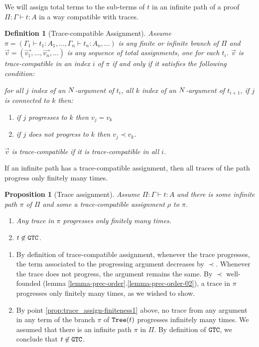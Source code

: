 \documentclass{article}
\newtheorem{proposition}[theorem]{Proposition}
\newtheorem{definition}[theorem]{Definition}
\newenvironment{proof}[1][Proof]{\begin{trivlist}
\item[\hskip \labelsep {\bfseries #1}]}{\end{trivlist}}
\begin{document}
We will assign total terms to  the sub-terms of $t$
in an infinite path of a proof $\Pi : \Gamma \vdash t: A$ in a way compatible with traces. 


\begin{definition}[Trace-compatible Assignment]
\label{definition-trace-compatible}
Assume $\pi  = (\Gamma_1 \vdash t_1:A_1, \ldots, \Gamma_n \vdash t_n:A_n, \ldots)$ 
is any finite or infinite branch of $\Pi$
and $\vec{v} = (\vec{v_1}, \ldots, \vec{v_n}, \ldots)$ 
is any sequence of total assignments, one for each $t_i$. 
$\vec{v}$ is \emph{trace-compatible} in an index $i$ of $\pi$  
if and only if it satisfies the following condition:

  for all $j$  index of an ${N}$-argument of $t_i$, 
  all $k$ index of an ${N}$-argument of $t_{i+1}$, 
  if $j$ is connected to $k$ then:
 \begin{enumerate}
 \item
 if $j$ progresses to $k$ then $v_j = v_k$
 \item
 if $j$ does not progress to $k$ then $v_j \prec v_k$.
 \end{enumerate}
$\vec{v}$ is \emph{trace-compatible} if it is trace-compatible in all $i$.
\end{definition}

If an infinite path has a trace-compatible assignment, 
then all traces of the path progress only finitely many times.



\begin{proposition}[Trace assignment]
\label{prop:trace_assign-finiteness}
Assume $\Pi:\Gamma \vdash t:A$ and there is some infinite path $\pi$ of $\Pi$ and
some a trace-compatible assignment  $\rho$ to $\pi$. 
\begin{enumerate}
\item
\label{prop:trace_assign-finiteness1}
Any trace in $\pi$ progresses only finitely many times.
\item
\label{prop:trace_assign-finiteness2}
$t \not \in {\tt GTC}$.
\end{enumerate}
\end{proposition}



\begin{proof}
\begin{enumerate}
\item
By definition of trace-compatible assignment, whenever the trace progresses, 
the term associated to the progressing argument decreases by $\prec$.
Whenever the trace does not progress, the argument remains the same.
By $\prec$ well-founded (lemma \ref{lemma-prec-order}.\ref{lemma-prec-order-02}), 
a trace in $\pi$ progresses only finitely many times, as we wished to show.
\item
By point \ref{prop:trace_assign-finiteness1} above, 
no trace from any argument in any term of the branch $\pi$ of ${\tt Tree}(t)$ progresses infinitely many times.
We assumed that there is an infinite path $\pi$ in $\Pi$.
By definition of ${\tt GTC}$, we conclude that $t \not \in {\tt GTC}$. 
\end{enumerate}
\end{proof}
\end{document}
